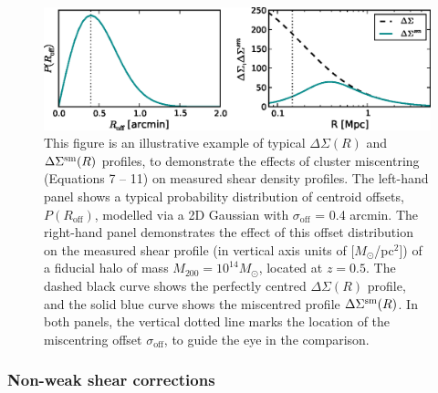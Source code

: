 \begin{figure}
\begin{center}
  \includegraphics[scale=1.0]{plots_ch4/PofRc_DeltaSigma_example.eps}
  \caption[Example of Miscentering Effect on Shear Profile]{This figure is an illustrative example of typical $\Delta\Sigma(R)$ and $\Delta\Sigma^{\rm sm}(R)$ profiles, to demonstrate the effects of cluster miscentring (Equations 7 -- 11) on measured shear density profiles. The left-hand panel shows a typical probability distribution of centroid offsets, $P(R_{\mathrm{off}})$, modelled via a 2D Gaussian with $\sigma_{\mathrm{off}}$ = 0.4 arcmin. The right-hand panel demonstrates the effect of this offset distribution on the measured shear profile (in vertical axis units of [$M_{\odot}$/pc$^2$]) of a fiducial halo of mass $M_{200}=10^{14} M_{\odot}$, located at $z=0.5$. The dashed black curve shows the perfectly centred $\Delta\Sigma(R)$ profile, and the solid blue curve shows the miscentred profile $\Delta\Sigma^{\rm sm}(R)$. In both panels, the vertical dotted line marks the location of the miscentring offset $\sigma_{\mathrm{off}}$, to guide the eye in the comparison.}
\label{plot:miscentring}
\end{center}
\end{figure}


\subsubsection{Non-weak shear corrections}


